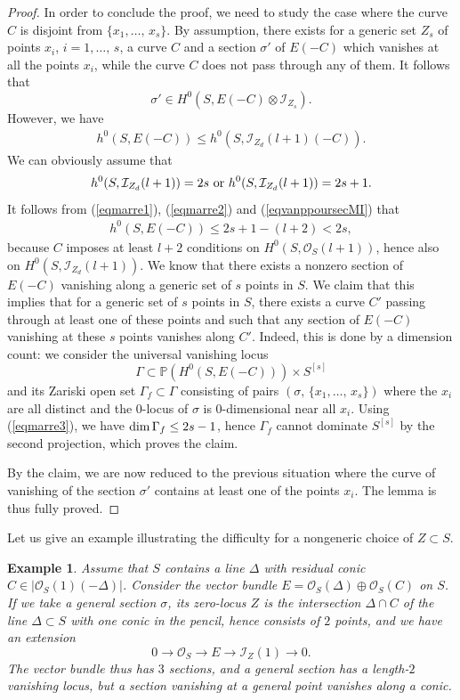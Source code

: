 \documentclass[10pt]{article}
\newtheorem{example}[theo]{Example}
\begin{document}
\begin{proof}
In order to conclude the proof, we need to study the case where the curve $C$ is disjoint from $\{x_1,\ldots,\,x_s\}$.
By assumption, there exists for a generic set $Z_s$ of points $x_i$, $i=1,\ldots,\,s$, a curve $C$ and a section $\sigma'$ of $E(-C)$ which vanishes at all the points $x_i$, while the curve $C$ does not pass through any of them.   It follows that
$$\sigma'\in H^0(S,E(-C)\otimes \mathcal{I}_{Z_s}).$$
However, we have
\begin{eqnarray}\label{eqmarre1}h^0(S,E(-C))\leq h^0(S,\mathcal{I}_{Z_d}(l+1)(-C)).\end{eqnarray}
We can obviously assume that
\begin{eqnarray}\label{eqmarre2}h^0(S,\mathcal{I}_{Z_d}(l+1))=2s\,\,{\rm or}\,\,h^0(S,\mathcal{I}_{Z_d}(l+1))=2s+1.\end{eqnarray}
 It follows from (\ref{eqmarre1}),  (\ref{eqmarre2}) and (\ref{eqvanppoursecMI}) that
 \begin{eqnarray}\label{eqmarre3} h^0(S,E(-C))\leq 2s+1-(l+2) <2s, \end{eqnarray}
 because $C$ imposes at least $l+2$ conditions on $H^0(S,\mathcal{O}_S(l+1))$, hence also on $H^0(S,\mathcal{I}_{Z_d}(l+1))$.
 We know that there exists a nonzero section of $E(-C)$ vanishing  along a generic set of $s$ points in $S$.
  We claim that this  implies that for a generic set of $s$ points in $S$, there exists a curve $C'$ passing through at least one of these points and such that any section of $E(-C)$ vanishing  at these $s$ points  vanishes along $C'$. Indeed, this is done by a dimension count: we consider the universal vanishing locus
 $$\Gamma\subset \mathbb{P}(H^0(S,E(-C)))\times S^{[s]}$$
 and its Zariski open set $\Gamma_f\subset \Gamma$ consisting of pairs $(\sigma,\,\{x_1,\ldots,\,x_{s}\})$ where the $x_i$ are all distinct and the  $0$-locus of $\sigma$ is $0$-dimensional near all $x_i$.  Using  (\ref{eqmarre3}), we have ${\rm dim}\,\Gamma_f\leq 2s-1$, hence $\Gamma_f$ cannot dominate $S^{[s]}$ by the second projection, which proves the claim.

  By the claim, we are now reduced to the previous situation where the curve of vanishing of the section $\sigma'$  contains at least one of the points $x_i$. The lemma is thus fully proved.
 \end{proof}
 Let us give an example illustrating the difficulty  for a nongeneric choice of $Z\subset S$.

\begin{example} \label{examplepasbon} {\rm  Assume that $S$ contains a line $\Delta$ with residual conic $C\in|\mathcal{O}_S(1)(-\Delta)|$. Consider the vector bundle $E=\mathcal{O}_S(\Delta)\oplus \mathcal{O}_S(C)$ on $S$.  If we take a general section $\sigma$, its zero-locus $Z$ is the intersection $\Delta\cap C$ of the line $\Delta\subset S$ with one conic in the pencil, hence consists of $2$ points, and we have an extension
$$0\rightarrow \mathcal{O}_S\rightarrow E\rightarrow \mathcal{I}_Z(1)\rightarrow 0.$$
The vector bundle thus  has $3$ sections, and a general section has a length-$2$ vanishing locus,  but a section vanishing at a general point vanishes along a conic.}
 \end{example}
\end{document}
